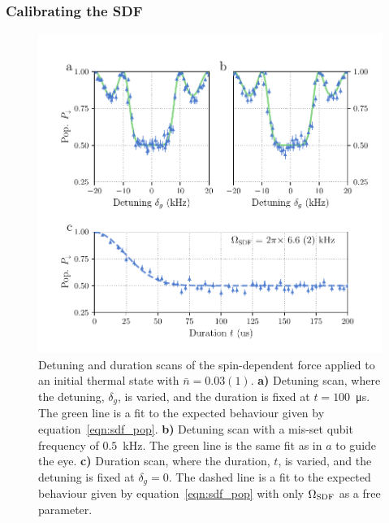 \subsubsection{Calibrating the SDF}

    \begin{figure}
        \begin{center}
        \noindent\includegraphics[width=\linewidth]{
            figures/pdf_figure/sdf.pdf
            }
        \end{center}
        \caption{
            Detuning and duration scans of the spin-dependent force applied to an initial thermal state with $\bar{n} = 0.03(1)$. 
            \textbf{a)} Detuning scan, where the detuning, $\delta_g$, is varied, and the duration is fixed at $t=100$~\unit{\us}. The green line is a fit to the expected behaviour given by equation~\ref{eqn:sdf_pop}. 
            \textbf{b)} Detuning scan with a mis-set qubit frequency of $0.5$~\unit{\kHz}. The green line is the same fit as in $a$ to guide the eye. 
            \textbf{c)} Duration scan, where the duration, $t$, is varied, and the detuning is fixed at $\delta_g = 0$. The dashed line is a fit to the expected behaviour given by equation~\ref{eqn:sdf_pop} with only $\Omega_{\rm SDF}$ as a free parameter.
            }
        \label{fig:SDF}
    \end{figure}

